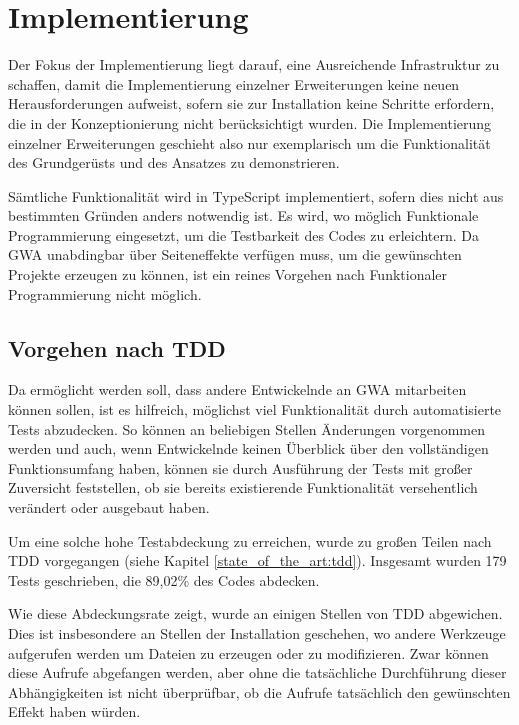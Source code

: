 \section{Implementierung}
\label{implementierung}

Der Fokus der Implementierung liegt darauf, eine Ausreichende Infrastruktur zu schaffen, damit die Implementierung einzelner Erweiterungen keine neuen Herausforderungen aufweist, sofern sie zur Installation keine Schritte erfordern, die in der Konzeptionierung nicht berücksichtigt wurden. Die Implementierung einzelner Erweiterungen geschieht also nur exemplarisch um die Funktionalität des Grundgerüsts und des Ansatzes zu demonstrieren.

Sämtliche Funktionalität wird in TypeScript implementiert, sofern dies nicht aus bestimmten Gründen anders notwendig ist. Es wird, wo möglich Funktionale Programmierung eingesetzt, um die Testbarkeit des Codes zu erleichtern. Da \gls{GWA} unabdingbar über Seiteneffekte verfügen muss, um die gewünschten Projekte erzeugen zu können, ist ein reines Vorgehen nach Funktionaler Programmierung nicht möglich.

\subsection{Vorgehen nach TDD}
Da ermöglicht werden soll, dass andere Entwickelnde an \gls{GWA} mitarbeiten können sollen, ist es hilfreich, möglichst viel Funktionalität durch automatisierte Tests abzudecken. So können an beliebigen Stellen Änderungen vorgenommen werden und auch, wenn Entwickelnde keinen Überblick über den vollständigen Funktionsumfang haben, können sie durch Ausführung der Tests mit großer Zuversicht feststellen, ob sie bereits existierende Funktionalität versehentlich verändert oder ausgebaut haben.

Um eine solche hohe Testabdeckung zu erreichen, wurde zu großen Teilen nach \gls{TDD} vorgegangen (siehe Kapitel \ref{state_of_the_art:tdd}). Insgesamt wurden 179 Tests geschrieben, die 89,02\% des Codes abdecken.

Wie diese Abdeckungsrate zeigt, wurde an einigen Stellen von \gls{TDD} abgewichen. Dies ist insbesondere an Stellen der Installation geschehen, wo andere Werkzeuge aufgerufen werden um Dateien zu erzeugen oder zu modifizieren. Zwar können diese Aufrufe abgefangen werden, aber ohne die tatsächliche Durchführung dieser Abhängigkeiten ist nicht überprüfbar, ob die Aufrufe tatsächlich den gewünschten Effekt haben würden.

